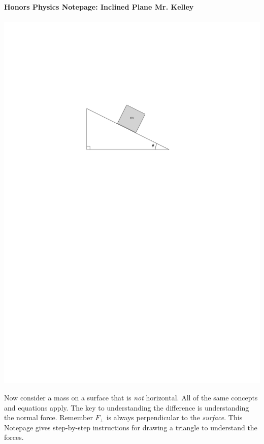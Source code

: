 \documentclass[12pt]{report}
\begin{document}
{\bf{Honors Physics} \hfill Notepage: Inclined Plane \hfill {Mr. Kelley}} \\ \\

\hfill \includegraphics[scale = .75]{inclinedPlane_1} \hfill \mbox{}

\vspace{.5cm}

\hfill \parbox{12cm}{Now consider a mass on a surface that is \emph{not} horizontal.  All of the same concepts and equations apply.  The key to understanding the difference is understanding the normal force.  Remember $F_\bot$ is always perpendicular to the \emph{surface}.  This Notepage gives step-by-step instructions for drawing a triangle to understand the forces.} \hspace{4cm}

\vspace{.5cm}
\end{document}
